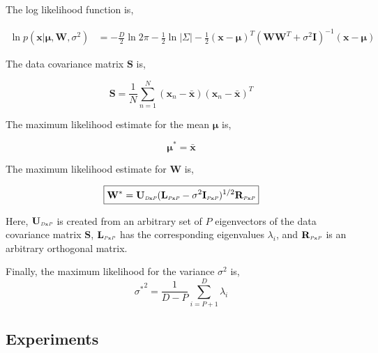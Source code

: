 The log likelihood function is,

\begin{equation}
\begin{array}{lllll}
\ln p(\mathbf{x}|\mathbf{\mu, W}, \sigma^2) &= -\frac{D}{2}\ln 2\pi -\frac{1}{2} \ln |\Sigma| -\frac{1}{2}(\mathbf{x}-\mathbf{\mu})^T(\mathbf{W}\mathbf{W}^T + \sigma^2 \mathbf{I})^{-1}(\mathbf{x}-\mathbf{\mu})
\end{array}
\end{equation}



The data covariance matrix $\mathbf{S}$ is,

\begin{equation}
\mathbf{S} = \frac{1}{N} \sum\limits_{n=1}^N (\mathbf{x}_n - \bar{\mathbf{x}})(\mathbf{x}_n - \bar{\mathbf{x}})^T
\end{equation}

The maximum likelihood estimate for the mean $\mathbf{\mu}$ is,

\begin{equation}
\boxed{
\mathbf{\mu}^* = \mathbf{\bar{x}}}
\end{equation}

The maximum likelihood estimate for $\mathbf{W}$ is,

\begin{equation}
\boxed{
\mathbf{W}^* = \mathbf{U}_{ \textrm{\tiny \emph{D}x\emph{P}}}(\mathbf{L}_{ \textrm{\tiny \emph{P}x\emph{P}}} - \sigma^2\mathbf{I}_{ \textrm{\tiny \emph{P}x\emph{P}}})^{1/2}\mathbf{R}_{ \textrm{\tiny \emph{P}x\emph{P}}}}
\end{equation}


Here, $\mathbf{U}_{ \textrm{\tiny \emph{D}x\emph{P}}}$ is created from an arbitrary set of $P$ eigenvectors of the data covariance matrix $\mathbf{S}$, $\mathbf{L}_{ \textrm{\tiny \emph{P}x\emph{P}}}$ has the corresponding eigenvalues $\lambda_i$, and $\mathbf{R}_{ \textrm{\tiny \emph{P}x\emph{P}}}$ is an arbitrary orthogonal matrix.

Finally, the maximum likelihood for the variance $\sigma^2$ is,
\begin{equation}
\boxed{
{\sigma^*}^2 = \frac{1}{D-P}\sum\limits_{i=P+1}^D \lambda_i}
\end{equation}


\subsection{Experiments}

